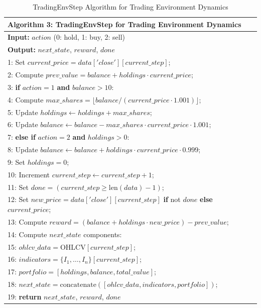 \begin{table}[h]
\small
\centering
\begin{tabular}{|p{14cm}|}
\hline
\textbf{Algorithm 3: TradingEnvStep for Trading Environment Dynamics} \\
\hline
\textbf{Input:} $action$ (0: hold, 1: buy, 2: sell) \\
\textbf{Output:} $next\_state$, $reward$, $done$ \\
\hline
1: Set $current\_price = data['close'][current\_step]$; \\
2: Compute $prev\_value = balance + holdings \cdot current\_price$; \\
3: \textbf{if} $action = 1$ \textbf{and} $balance > 10$: \\
4: \quad Compute $max\_shares = \lfloor balance / (current\_price \cdot 1.001) \rfloor$; \\
5: \quad Update $holdings \leftarrow holdings + max\_shares$; \\
6: \quad Update $balance \leftarrow balance - max\_shares \cdot current\_price \cdot 1.001$; \\
7: \textbf{else if} $action = 2$ \textbf{and} $holdings > 0$: \\
8: \quad Update $balance \leftarrow balance + holdings \cdot current\_price \cdot 0.999$; \\
9: \quad Set $holdings = 0$; \\
10: Increment $current\_step \leftarrow current\_step + 1$; \\
11: Set $done = (current\_step \geq \text{len}(data) - 1)$; \\
12: Set $new\_price = data['close'][current\_step]$ \textbf{if} not $done$ \textbf{else} $current\_price$; \\
13: Compute $reward = (balance + holdings \cdot new\_price) - prev\_value$; \\
14: Compute $next\_state$ components: \\
15: \quad $ohlcv\_data = \text{OHLCV}[current\_step]$; \\
16: \quad $indicators = \{I_1, \ldots, I_n\}[current\_step]$; \\
17: \quad $portfolio = [holdings, balance, total\_value]$; \\
18: \quad $next\_state = \text{concatenate}([ohlcv\_data, indicators, portfolio])$; \\
19: \textbf{return} $next\_state$, $reward$, $done$ \\
\hline
\end{tabular}
\caption{TradingEnvStep Algorithm for Trading Environment Dynamics}
\label{tab:tradingenvstep_algorithm}
\end{table}


